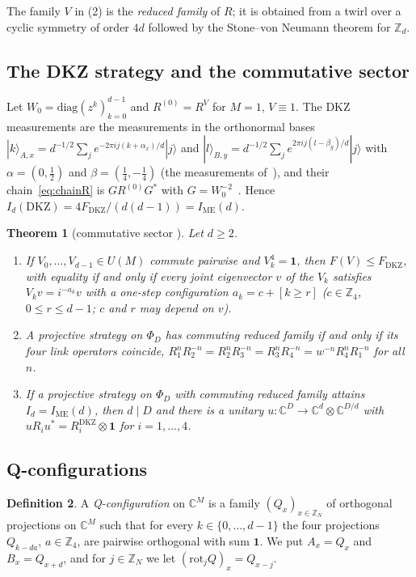 \documentclass[11pt]{amsart}
\newtheorem{theorem}{Theorem}[section]
\theoremstyle{definition}
\newtheorem{definition}[theorem]{Definition}
\theoremstyle{remark}
\numberwithin{equation}{section}
\newcommand{\Z}{\mathbb{Z}}
\newcommand{\C}{\mathbb{C}}
\newcommand{\FD}{F_{\mathrm{DKZ}}}
\newcommand{\IME}{I_{\mathrm{ME}}}
\newcommand{\one}{\mathbf{1}}
\begin{document}
The family $V$ in (2) is the \emph{reduced family} of $R$; it is obtained from a twirl over a cyclic symmetry of order
$4d$ followed by the Stone--von Neumann theorem for $\Z_d$.

\subsection{The DKZ strategy and the commutative sector}\label{subsec:dkz}
Let $W_0=\mathrm{diag}(z^k)_{k=0}^{d-1}$ and $R^{(0)}=R^V$ for $M=1$, $V\equiv1$. The DKZ measurements are the
measurements in the orthonormal bases $|k\rangle_{A,x}=d^{-1/2}\sum_je^{-2\pi ij(k+\alpha_x)/d}|j\rangle$ and
$|l\rangle_{B,y}=d^{-1/2}\sum_je^{2\pi ij(l-\beta_y)/d}|j\rangle$ with $\alpha=(0,\frac12)$ and
$\beta=(\frac14,-\frac14)$ (the measurements of~\cite[eqs.~(12)--(15)]{CGLMP}), and their chain~\eqref{eq:chainR} is
$GR^{(0)}G^*$ with $G=W_0^{-2}$~\cite[Section~2.4]{MS-classical}. Hence $I_d(\mathrm{DKZ})=4\FD/(d(d-1))=\IME(d)$.

\begin{theorem}[commutative sector {\cite[Theorem~B, Corollary~C, Proposition~2.4]{MS-classical}}]\label{thm:commutative}
Let $d\ge2$.
\begin{enumerate}
\item If $V_0,\dots,V_{d-1}\in U(M)$ commute pairwise and $V_k^4=\one$, then $F(V)\le\FD$, with equality if and only if
every joint eigenvector $v$ of the $V_k$ satisfies $V_kv=i^{-a_k}v$ with a \emph{one-step} configuration
$a_k=c+[k\ge r]$ ($c\in\Z_4$, $0\le r\le d-1$; $c$ and $r$ may depend on $v$).
\item A projective strategy on $\Phi_D$ has commuting reduced family if and only if its four link operators
coincide, $R_1^nR_2^{-n}=R_2^nR_3^{-n}=R_3^nR_4^{-n}=w^{-n}R_4^nR_1^{-n}$ for all $n$.
\item If a projective strategy on $\Phi_D$ with commuting reduced family attains $I_d=\IME(d)$, then $d\mid D$ and
there is a unitary $u\colon\C^D\to\C^d\otimes\C^{D/d}$ with $uR_iu^*=R_i^{\mathrm{DKZ}}\otimes\one$ for $i=1,\dots,4$.
\end{enumerate}
\end{theorem}

\subsection{Q-configurations}
\begin{definition}\label{def:Qconf}
A \emph{Q-configuration} on $\C^M$ is a family $(Q_x)_{x\in\Z_N}$ of orthogonal projections on $\C^M$ such that for every
$k\in\{0,\dots,d-1\}$ the four projections $Q_{k-da}$, $a\in\Z_4$, are pairwise orthogonal with sum $\one$. We put
$A_x=Q_x$ and $B_x=Q_{x+d}$, and for $j\in\Z_N$ we let $(\mathrm{rot}_jQ)_x=Q_{x-j}$.
\end{definition}
\end{document}
